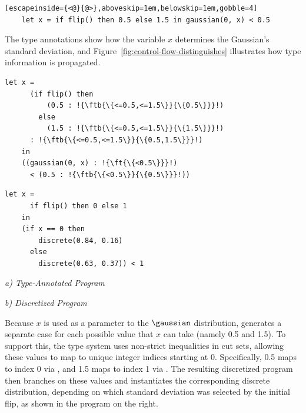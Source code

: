 \begin{lstlisting}[escapeinside={<@}{@>},aboveskip=1em,belowskip=1em,gobble=4]
    let x = if flip() then 0.5 else 1.5 in gaussian(0, x) < 0.5
\end{lstlisting}

\noindent %
The type annotations show how the variable $x$ determines the Gaussian's standard deviation, and Figure~\ref{fig:control-flow-distinguishes} illustrates how type information is propagated.

\begin{center}
    \begin{minipage}[c]{0.56\linewidth}
    \centering
    \begin{lstlisting}[aboveskip=0.6em,belowskip=0.6em,escapechar=!,gobble=4]
    let x =
      (if flip() then
          (0.5 : !{\ftb{\{<=0.5,<=1.5\}}{\{0.5\}}}!)
        else
          (1.5 : !{\ftb{\{<=0.5,<=1.5\}}{\{1.5\}}}!)
      : !{\ftb{\{<=0.5,<=1.5\}}{\{0.5,1.5\}}}!)
    in
    ((gaussian(0, x) : !{\ft{\{<0.5\}}}!)
      < (0.5 : !{\ftb{\{<0.5\}}{\{0.5\}}}!))
    \end{lstlisting}
    \end{minipage}
    \hfill
    \begin{minipage}[c]{0.4\linewidth}
    \centering
    \begin{minipage}{0.92\linewidth}
    \begin{lstlisting}[aboveskip=0.6em,belowskip=0.6em,gobble=4]
    let x =
      if flip() then 0 else 1
    in
    (if x == 0 then
        discrete(0.84, 0.16)
      else
        discrete(0.63, 0.37)) < 1
    \end{lstlisting}
    \end{minipage}
    \end{minipage}

    \smallskip
    \begin{minipage}{0.42\linewidth}
    \centering
    \textit{a) Type-Annotated Program}
    \end{minipage}
    \hfill
    \begin{minipage}{0.40\linewidth}
    \centering
    \textit{b) Discretized Program}
    \end{minipage}
    \label{fig:examples:5}
\end{center}
\vspace{0.6em}

\noindent Because $x$ is used as a parameter to the $\gaussian$ distribution, \Slice{} generates a separate case for each possible value that $x$ can take (namely 0.5 and 1.5). To support this, the type system uses non-strict inequalities in cut sets, allowing these values to map to unique integer indices starting at 0. Specifically, 0.5 maps to index 0 via , and 1.5 maps to index 1 via . The resulting discretized program then branches on these values and instantiates the corresponding discrete distribution, depending on which standard deviation was selected by the initial flip, as shown in the program on the right.

